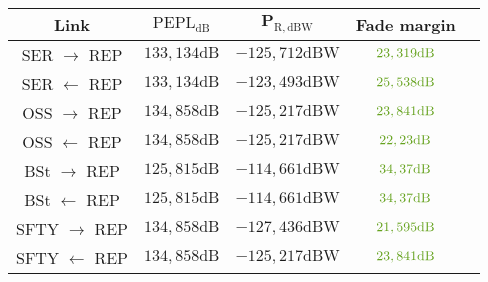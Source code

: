 \footnotesize
\begin{tabular}{|c|c|c|c|c|}
	\hline
	\textbf{Link} & $\boldsymbol{\mathrm{PEPL}_\mathrm{dB}}$ & $\boldsymbol{P_\mathrm{R,dBW}}$ & \textbf{Fade margin} \\
	\hline
	SER $\rightarrow$ REP & $133,134\mathrm{dB}$ & $-125,712\mathrm{dBW}$ & $\color{rgb, 255:red, 101; green, 162; blue, 30 }23,319\mathrm{dB}$ \\
	\color{rgb, 255:red, 196; green, 135; blue, 29 }SER $\leftarrow$ REP & $133,134\mathrm{dB}$ & $-123,493\mathrm{dBW}$ & $\color{rgb, 255:red, 101; green, 162; blue, 30 }25,538\mathrm{dB}$ \\
	OSS $\rightarrow$ REP & $134,858\mathrm{dB}$ & $-125,217\mathrm{dBW}$ & $\color{rgb, 255:red, 101; green, 162; blue, 30 }23,841\mathrm{dB}$ \\
	\color{rgb, 255:red, 196; green, 135; blue, 29 }OSS $\leftarrow$ REP & $134,858\mathrm{dB}$ & $-125,217\mathrm{dBW}$ & $\color{rgb, 255:red, 101; green, 162; blue, 30 }22,23\mathrm{dB}$ \\
	\color{rgb, 255:red, 196; green, 135; blue, 29 }BSt $\rightarrow$ REP & $125,815\mathrm{dB}$ & $-114,661\mathrm{dBW}$ & $\color{rgb, 255:red, 101; green, 162; blue, 30 }34,37\mathrm{dB}$ \\
	\color{rgb, 255:red, 196; green, 135; blue, 29 }BSt $\leftarrow$ REP & $125,815\mathrm{dB}$ & $-114,661\mathrm{dBW}$ & $\color{rgb, 255:red, 101; green, 162; blue, 30 }34,37\mathrm{dB}$ \\
	SFTY $\rightarrow$ REP & $134,858\mathrm{dB}$ & $-127,436\mathrm{dBW}$ & $\color{rgb, 255:red, 101; green, 162; blue, 30 }21,595\mathrm{dB}$ \\
	\color{rgb, 255:red, 196; green, 135; blue, 29 }SFTY $\leftarrow$ REP &  $134,858\mathrm{dB}$& $-125,217\mathrm{dBW}$ & $\color{rgb, 255:red, 101; green, 162; blue, 30 }23,841\mathrm{dB}$ \\
	\hline
\end{tabular}